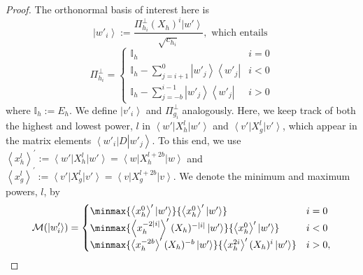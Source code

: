 \documentclass{theoretics}
\begin{document}
\begin{proof}
  The orthonormal basis
  of interest here is
  \begin{equation}
    \left|w'_{i}\right\rangle :=\frac{\Pi_{h_{i}}^{\perp}(X_{h})^{i}\left|w'\right\rangle }{\sqrt{c_{h_{i}}}}, \text{ which entails }\label{eq:alignedBalancedMonomialVectors}
  \end{equation}
  \begin{equation}
    \Pi_{h_{i}}^{\perp}=\begin{cases}
      \mathbb{I}_{h}                                                                       & i=0 \\
      \mathbb{I}_{h}-\sum_{j=i+1}^{0}\left|w'_{j}\right\rangle \left\langle w'_{j}\right|  & i<0 \\
      \mathbb{I}_{h}-\sum_{j=-b}^{i-1}\left|w'_{j}\right\rangle \left\langle w'_{j}\right| & i>0
    \end{cases}\label{eq:alignedBalancedMonomialProjectors}
  \end{equation}
  where $\mathbb{I}_{h}:=E_{h}$. We define $\left|v'_{i}\right\rangle $
  and $\Pi_{g_{i}}^{\perp}$ analogously. Here, we keep
  track of both the highest and lowest power, $l$ in $\left\langle w'\right|X_{h}^{l}\left|w'\right\rangle $
  and $\left\langle v'\right|X_{g}^{l}\left|v'\right\rangle $, which
  appear in the matrix elements $\left\langle w'_{i}\right|D\left|w'_{j}\right\rangle $.
  To this end, we use $\left\langle x_{h}^{l}\right\rangle ^{\prime}:=\left\langle w'\right|X_{h}^{l}\left|w'\right\rangle =\left\langle w\right|X_{h}^{l+2b}\left|w\right\rangle $
  and $\left\langle x_{g}^{l}\right\rangle ^{\prime}:=\left\langle v'\right|X_{g}^{l}\left|v'\right\rangle =\left\langle v\right|X_{g}^{l+2b}\left|v\right\rangle $.
  We denote the minimum and maximum powers, $l$, by
  \begin{displaymath}
    \mathcal{M}(\left|w'_{i}\right\rangle )=\begin{cases}
      \minmax{\left\langle x_{h}^{0}\right\rangle ^{\prime}\left|w'\right\rangle }{\left\langle x_{h}^{0}\right\rangle ^{\prime}\left|w'\right\rangle }                           & i=0  \\
      \minmax{\left\langle x_{h}^{-2|i|}\right\rangle ^{\prime}(X_{h})^{-|i|}\left|w'\right\rangle }{\left\langle x_{h}^{0}\right\rangle ^{\prime}\left|w'\right\rangle }         & i<0  \\
      \minmax{\left\langle x_{h}^{-2b}\right\rangle ^{\prime}(X_{h})^{-b}\left|w'\right\rangle }{\left\langle x_{h}^{2i}\right\rangle ^{\prime}(X_{h})^{i}\left|w'\right\rangle } & i>0,

\end{cases}
\end{displaymath}
\end{proof}
\end{document}
